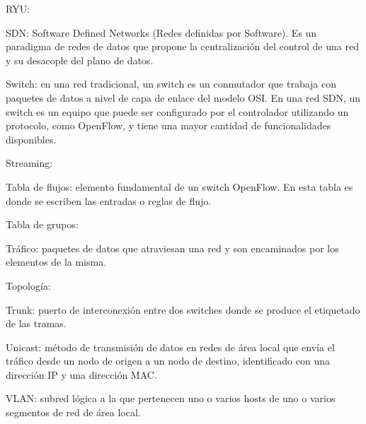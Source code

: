 \documentclass[12pt,a4paper,oneside]{book}
\begin{document}
\vspace{0,5cm}

RYU:

\vspace{0,5cm}

SDN: Software Defined Networks (Redes definidas por Software). Es un paradigma de redes de datos que propone la centralización del control de una red y su desacople del plano de datos.

\vspace{0,5cm}

Switch: en una red tradicional, un switch es un conmutador que trabaja con paquetes de datos a nivel de capa de enlace del modelo OSI. En una red SDN, un switch es un equipo que puede ser configurado por el controlador utilizando un protocolo, como OpenFlow, y tiene una mayor cantidad de funcionalidades disponibles.

\vspace{0,5cm}

Streaming:

\vspace{0,5cm}

Tabla de flujos: elemento fundamental de un switch OpenFlow. En esta tabla es donde se escriben las entradas o reglas de flujo.

\vspace{0,5cm}

Tabla de grupos:

\vspace{0,5cm}

Tráfico: paquetes de datos que atraviesan una red y son encaminados por los elementos de la misma.

\vspace{0,5cm}

Topología:

\vspace{0,5cm}

Trunk: puerto de interconexión entre dos switches donde se produce el etiquetado de las tramas.

\vspace{0,5cm}

Unicast: método de transmisión de datos en redes de área local que envía el tráfico desde un nodo de origen a un nodo de destino, identificado con una dirección IP y una dirección MAC.

\vspace{0,5cm}

VLAN: subred lógica a la que pertenecen uno o varios hosts de uno o varios segmentos de red de área local.
\end{document}
